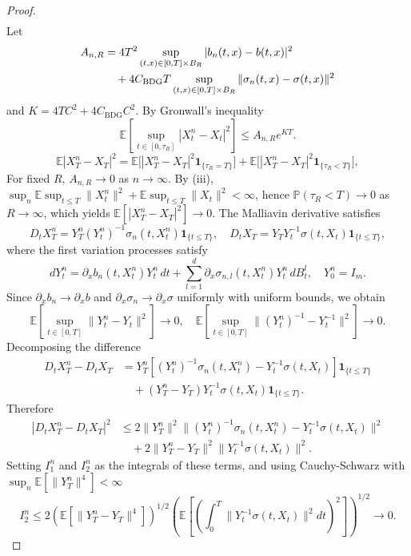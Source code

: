 \documentclass[]{interact}
\newcommand{\1}{\mathbf{1}}
\theoremstyle{plain}%
\theoremstyle{definition}
\theoremstyle{remark}
\numberwithin{equation}{section}
\begin{document}
\begin{proof}
\begin{align*}
\end{align*}
%
Let 
\begin{align}
A_{n,R} &= 4T^2 \sup_{(t,x) \in [0,T] \times B_R} |b_n(t, x) - b(t, x)|^2 \notag\\
&\quad + 4C_{\mathrm{BDG}}T \sup_{(t,x) \in [0,T] \times B_R} \|\sigma_n(t, x) - \sigma(t, x)\|^2
\end{align}
and $K = 4TC^2 + 4C_{\mathrm{BDG}}C^2$. By Gronwall's inequality
\[
\mathbb{E}\left[\sup_{t \in [0,\tau_R]} |X_t^n - X_t|^2\right] \leq A_{n,R} e^{KT}.
\]
\[
\mathbb{E}|X_T^n-X_T|^2 
= \mathbb{E}\big[|X_T^n-X_T|^2\mathbf{1}_{\{\tau_R=T\}}\big]
  + \mathbb{E}\big[|X_T^n-X_T|^2\mathbf{1}_{\{\tau_R<T\}}\big],
\]
For fixed \(R\), \(A_{n,R} \to 0\) as \(n \to \infty\). By (iii), \(\sup_n \mathbb{E}\sup_{t\le T}\|X_t^n\|^2 + \mathbb{E}\sup_{t\le T}\|X_t\|^2 < \infty\), hence \(\mathbb{P}(\tau_R<T)\to0\) as \(R\to\infty\), which yields \(\mathbb{E}[|X_T^n-X_T|^2]\to0\).
%
The Malliavin derivative satisfies
\[
D_t X_T^n = Y_T^n (Y_t^n)^{-1} \sigma_n(t, X_t^n) \mathbf{1}_{\{t \leq T\}}, \quad D_t X_T = Y_T Y_t^{-1} \sigma(t, X_t) \mathbf{1}_{\{t \leq T\}},
\]
where the first variation processes satisfy
\[
dY_t^n = \partial_x b_n(t, X_t^n) Y_t^n \, dt + \sum_{l=1}^d \partial_x \sigma_{n,l}(t, X_t^n) Y_t^n \, dB_t^l, \quad Y_0^n = I_m.
\]
%
Since \(\partial_x b_n \to \partial_x b\) and \(\partial_x \sigma_n \to \partial_x \sigma\) uniformly with uniform bounds, we obtain
\[
\mathbb{E}\left[\sup_{t \in [0,T]} \|Y_t^n - Y_t\|^2\right] \to 0, \quad \mathbb{E}\left[\sup_{t \in [0,T]} \|(Y_t^n)^{-1} - Y_t^{-1}\|^2\right] \to 0.
\]
%
Decomposing the difference
\begin{align*}
D_t X_T^n - D_t X_T &= Y_T^n [(Y_t^n)^{-1} \sigma_n(t, X_t^n) - Y_t^{-1} \sigma(t, X_t)] \mathbf{1}_{\{t \leq T\}} \\
&\quad + (Y_T^n - Y_T) Y_t^{-1} \sigma(t, X_t) \mathbf{1}_{\{t \leq T\}}.
\end{align*}
%
Therefore
\begin{align*}
|D_t X_T^n - D_t X_T|^2 &\leq 2\|Y_T^n\|^2 \|(Y_t^n)^{-1} \sigma_n(t, X_t^n) - Y_t^{-1} \sigma(t, X_t)\|^2 \\
&\quad + 2\|Y_T^n - Y_T\|^2 \|Y_t^{-1} \sigma(t, X_t)\|^2.
\end{align*}
%
Setting \(I_1^n\) and \(I_2^n\) as the integrals of these terms, and using Cauchy-Schwarz with \(\sup_n \mathbb{E}[\|Y_T^n\|^4] < \infty\)
\[
I_2^n \leq 2(\mathbb{E}[\|Y_T^n - Y_T\|^4])^{1/2} \left(\mathbb{E}\left[\left(\int_0^T \|Y_t^{-1} \sigma(t, X_t)\|^2 dt\right)^2\right]\right)^{1/2} \to 0.
\]
\end{proof}
\end{document}
